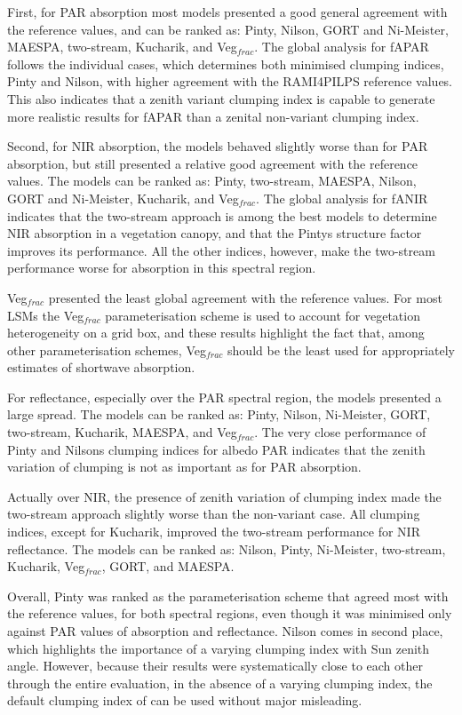 \documentclass[a4paper,11pt]{report}
\begin{document}
First, for PAR absorption most models presented a good general agreement with the reference values, and can be ranked as: Pinty, Nilson, GORT and Ni-Meister, MAESPA, two-stream, Kucharik, and Veg$_{frac}$. The global analysis for fAPAR follows the individual cases, which determines both minimised clumping indices, Pinty and Nilson, with higher agreement with the RAMI4PILPS reference values. This also indicates that a zenith variant clumping index is capable to generate more realistic results for fAPAR than a zenital non-variant clumping index.

Second, for NIR absorption, the models behaved slightly worse than for PAR absorption, but still presented a relative good agreement with the reference values. The models can be ranked as: Pinty, two-stream, MAESPA, Nilson, GORT and Ni-Meister, Kucharik, and Veg$_{frac}$. The global analysis for fANIR indicates that the two-stream approach is among the best models to determine NIR absorption in a vegetation canopy, and that the Pinty\textsinglequote s structure factor improves its performance. All the other indices, however, make the two-stream performance worse for absorption in this spectral region.

Veg$_{frac}$ presented the least global agreement with the reference values. For most LSMs the Veg$_{frac}$ parameterisation scheme is used to account for vegetation heterogeneity on a grid box, and these results highlight the fact that, among other parameterisation schemes, Veg$_{frac}$ should be the least used for appropriately estimates of shortwave absorption.

For reflectance, especially over the PAR spectral region, the models presented a large spread. The models can be ranked as: Pinty, Nilson, Ni-Meister, GORT, two-stream, Kucharik, MAESPA, and Veg$_{frac}$. The very close performance of Pinty and Nilson\textsinglequote s clumping indices for albedo PAR indicates that the zenith variation of clumping is not as important as for PAR absorption.

Actually over NIR, the presence of zenith variation of clumping index made the two-stream approach slightly worse than the non-variant case. All clumping indices, except for Kucharik, improved the two-stream performance for NIR reflectance. The models can be ranked as: Nilson, Pinty, Ni-Meister, two-stream, Kucharik, Veg$_{frac}$, GORT, and MAESPA.

Overall, Pinty was ranked as the parameterisation scheme that agreed most with the reference values, for both spectral regions, even though it was minimised only against PAR values of absorption and reflectance. Nilson comes in second place, which highlights the importance of a varying clumping index with Sun zenith angle. However, because their results were systematically close to each other through the entire evaluation, in the absence of a varying clumping index, the default clumping index of \citet{Nilson1971} can be used without major misleading.
\end{document}
